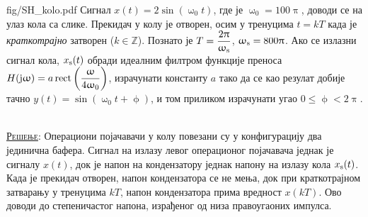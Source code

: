 \begin{slikaDesno}{fig/SH_kolo.pdf}
\PID Сигнал $x(t) = 2\sin\left( \upomega_0 t\right)$,
где је $\upomega_0 = 100\uppi$, доводи се на улаз кола са слике. Прекидач у колу је отворен, осим у 
тренуцима $t = kT$ када је \textit{краткотрајно} затворен ($k \in \mathbb Z$). 
Познато је $T = \dfrac{2\uppi}{\upomega_{\rm s}}$, $\upomega_{\rm s} = 800\uppi$.
Ако се излазни сигнал кола, $x_{\rm s}(t)$ 
обради идеалним филтром функције преноса $H({\rm j}\upomega) = 
a \operatorname{rect}\left(\dfrac{\upomega}{4\upomega_0} \right)$, 
израчунати константу $a$ тако да се као резулат добије тачно 
$y(t) = \sin\left( \upomega_0 t + \upphi \right)$, и том приликом израчунати угао $0 \leq \upphi < 2\uppi$.
\end{slikaDesno} \\


\textsc{\underline{Решење}}: Операциони појачавачи у колу повезани су у конфигурацију два јединична 
бафера. Сигнал на излазу левог операционог појачавача једнак је сигналу $x(t)$, 
док је напон на кондензатору једнак напону на излазу кола $x_{\rm s}(t)$. Када је прекидач отворен, 
напон кондензатора се не мења, док при краткотрајном затварању у тренуцима $kT$, напон кондензатора 
прима вредност $x(kT)$. Ово доводи до степеничастог напона, израђеног од низа правоугаоних импулса.

